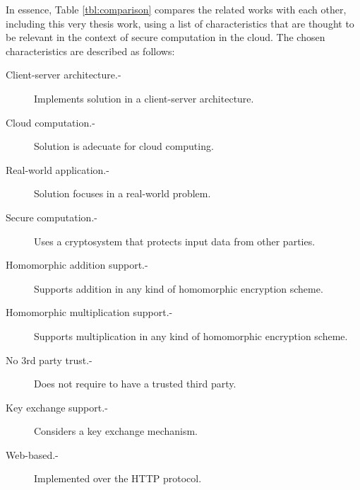 In essence, Table \ref{tbl:comparison} compares the related works with each other, including this very thesis work, using a list of characteristics that are thought to be relevant in the context of secure computation in the cloud. The chosen characteristics are described as follows:

\begin{description}
\item[Client-server architecture.-] Implements solution  in a client-server architecture.
\item[Cloud computation.-] Solution is adecuate for cloud computing.
\item[Real-world application.-] Solution focuses in a real-world problem.
\item[Secure computation.-] Uses a cryptosystem that protects input data from other parties.
\item[Homomorphic addition support.-] Supports addition in any kind of homomorphic encryption scheme.
\item[Homomorphic multiplication support.-] Supports multiplication in any kind of homomorphic encryption scheme.
\item[No 3rd party trust.-] Does not require to have a trusted third party.
\item[Key exchange support.-] Considers a key exchange mechanism.
\item[Web-based.-] Implemented over the HTTP protocol.
\end{description}

